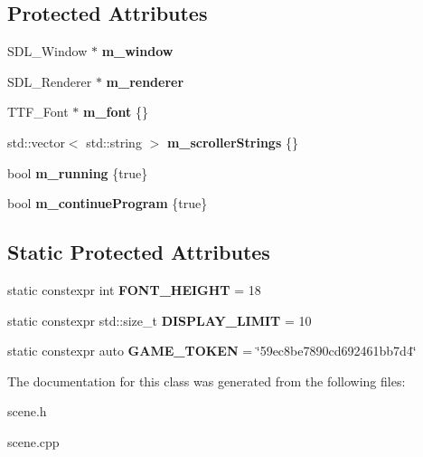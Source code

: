 \subsection*{Protected Attributes}
\begin{DoxyCompactItemize}
\item 
S\+D\+L\+\_\+\+Window $\ast$ {\bfseries m\+\_\+window}\hypertarget{classScene_a2354b78f3c352a5ee1fb6799464c3679}{}\label{classScene_a2354b78f3c352a5ee1fb6799464c3679}

\item 
S\+D\+L\+\_\+\+Renderer $\ast$ {\bfseries m\+\_\+renderer}\hypertarget{classScene_acd9747c72c40ab7301023a2d132cfa3d}{}\label{classScene_acd9747c72c40ab7301023a2d132cfa3d}

\item 
T\+T\+F\+\_\+\+Font $\ast$ {\bfseries m\+\_\+font} \{\}\hypertarget{classScene_a6070fcce3443855955f61f8c6d796033}{}\label{classScene_a6070fcce3443855955f61f8c6d796033}

\item 
std\+::vector$<$ std\+::string $>$ {\bfseries m\+\_\+scroller\+Strings} \{\}\hypertarget{classScene_aeff40e67af5e2ce0cfaed98d48c446e4}{}\label{classScene_aeff40e67af5e2ce0cfaed98d48c446e4}

\item 
bool {\bfseries m\+\_\+running} \{true\}\hypertarget{classScene_a59073327932c7ac2a6e005a8e41ed9ad}{}\label{classScene_a59073327932c7ac2a6e005a8e41ed9ad}

\item 
bool {\bfseries m\+\_\+continue\+Program} \{true\}\hypertarget{classScene_a03a880626c3317ce115bee5c2a996d45}{}\label{classScene_a03a880626c3317ce115bee5c2a996d45}

\end{DoxyCompactItemize}
\subsection*{Static Protected Attributes}
\begin{DoxyCompactItemize}
\item 
static constexpr int {\bfseries F\+O\+N\+T\+\_\+\+H\+E\+I\+G\+HT} = 18\hypertarget{classScene_a5e583ee7e29312bb52ffd9f5c382887a}{}\label{classScene_a5e583ee7e29312bb52ffd9f5c382887a}

\item 
static constexpr std\+::size\+\_\+t {\bfseries D\+I\+S\+P\+L\+A\+Y\+\_\+\+L\+I\+M\+IT} = 10\hypertarget{classScene_a9f3d25cb3ee314b720a03143df52b4c6}{}\label{classScene_a9f3d25cb3ee314b720a03143df52b4c6}

\item 
static constexpr auto {\bfseries G\+A\+M\+E\+\_\+\+T\+O\+K\+EN} = \char`\"{}59ec8be7890cd692461bb7d4\char`\"{}\hypertarget{classScene_ae5f60b96554e06b172570a2f809bc746}{}\label{classScene_ae5f60b96554e06b172570a2f809bc746}

\end{DoxyCompactItemize}


The documentation for this class was generated from the following files\+:\begin{DoxyCompactItemize}
\item 
scene.\+h\item 
scene.\+cpp\end{DoxyCompactItemize}
